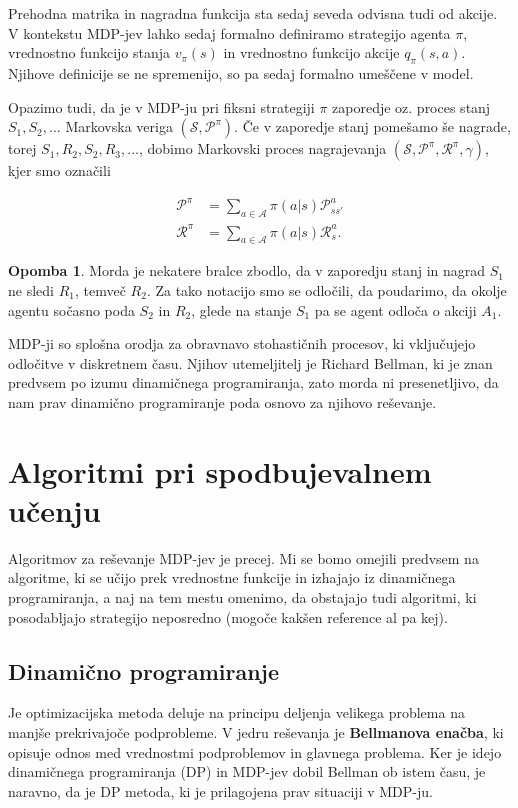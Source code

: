 \documentclass[12pt,a4paper]{amsart}
\theoremstyle{definition} %
\newtheorem{opomba}[definicija]{Opomba}
\theoremstyle{plain} %
\begin{document}
Prehodna matrika in nagradna funkcija sta sedaj seveda odvisna tudi od akcije. V kontekstu MDP-jev
lahko sedaj formalno definiramo strategijo agenta $\pi$, vrednostno funkcijo stanja $v_{\pi}(s)$ in 
vrednostno funkcijo akcije $q_{\pi}(s, a)$. Njihove definicije se ne spremenijo, so pa sedaj 
formalno umeščene v model.

Opazimo tudi, da je v MDP-ju pri fiksni strategiji $\pi$ zaporedje oz. proces stanj $S_1, S_2, 
\dots$ Markovska veriga $(\mathcal{S}, \mathcal{P}^\pi)$. Če v zaporedje stanj pomešamo še nagrade, 
torej $S_1, R_2, S_2, R_3, \dots$, dobimo Markovski proces nagrajevanja $(\mathcal{S}, 
\mathcal{P}^\pi, \mathcal{R}^\pi, \gamma)$, kjer smo označili

\begin{align*}
    \mathcal{P}^\pi &= \sum_{a \in \mathcal{A}} \pi(a|s) \mathcal{P}_{ss'}^a \\
    \mathcal{R}^\pi &= \sum_{a \in \mathcal{A}} \pi(a|s) \mathcal{R}_{s}^a. 
    \end{align*}

\begin{opomba}
    Morda je nekatere bralce zbodlo, da v zaporedju stanj in nagrad $S_1$ ne sledi $R_1$, temveč 
    $R_2$. Za tako notacijo smo se odločili, da poudarimo, da okolje agentu sočasno poda $S_2$ in 
    $R_2$, glede na stanje $S_1$ pa se agent odloča o akciji $A_1$.
\end{opomba}

MDP-ji so splošna orodja za obravnavo stohastičnih procesov, ki vključujejo odločitve v diskretnem 
času. Njihov utemeljitelj je Richard Bellman, ki je znan predvsem po izumu dinamičnega 
programiranja, zato morda ni presenetljivo, da nam prav dinamično programiranje poda osnovo za 
njihovo reševanje.

\section{Algoritmi pri spodbujevalnem učenju}
Algoritmov za reševanje MDP-jev je precej. Mi se bomo omejili predvsem na algoritme, ki se učijo 
prek vrednostne funkcije in izhajajo iz dinamičnega programiranja, a naj na tem mestu omenimo, 
da obstajajo tudi algoritmi, ki posodabljajo strategijo neposredno (mogoče kakšen reference al 
pa kej).

\subsection{Dinamično programiranje}
Je optimizacijska metoda deluje na principu deljenja velikega problema na manjše prekrivajoče 
podprobleme. V jedru reševanja je \textbf{Bellmanova enačba}, ki opisuje odnos med vrednostmi 
podproblemov in glavnega problema. Ker je idejo dinamičnega programiranja (DP) in MDP-jev dobil
Bellman ob istem času, je naravno, da je DP metoda, ki je prilagojena prav situaciji v MDP-ju.
\end{document}
